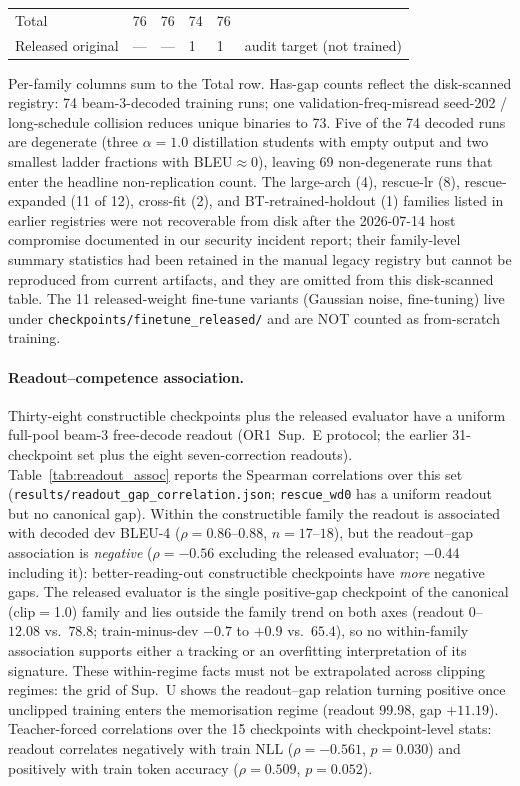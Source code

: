 \documentclass[pdflatex,sn-chicago]{sn-jnl}
\begin{document}
\begin{table}[h]
\begin{tabular}{p{4.2cm}p{1.0cm}p{1.5cm}p{1.4cm}p{1.4cm}p{3.0cm}}
\midrule
Total & 76 & 76 & 74 & 76 & \\
Released original & --- & --- & 1 & 1 & audit target (not trained) \\
\bottomrule
\end{tabular}
\par\smallskip
{\footnotesize Per-family columns sum to the Total row. Has-gap counts reflect the disk-scanned registry: 74 beam-3-decoded training runs; one validation-freq-misread seed-202 / long-schedule collision reduces unique binaries to 73. Five of the 74 decoded runs are degenerate (three $\alpha{=}1.0$ distillation students with empty output and two smallest ladder fractions with BLEU$\approx 0$), leaving 69 non-degenerate runs that enter the headline non-replication count. The large-arch (4), rescue-lr (8), rescue-expanded (11 of 12), cross-fit (2), and BT-retrained-holdout (1) families listed in earlier registries were not recoverable from disk after the 2026-07-14 host compromise documented in our security incident report; their family-level summary statistics had been retained in the manual legacy registry but cannot be reproduced from current artifacts, and they are omitted from this disk-scanned table. The 11 released-weight fine-tune variants (Gaussian noise, fine-tuning) live under \texttt{checkpoints/finetune\_released/} and are NOT counted as from-scratch training.}
\end{table}

\paragraph{Readout--competence association.}
Thirty-eight constructible checkpoints plus the released evaluator have a uniform full-pool beam-3 free-decode readout (OR1~Sup.~E protocol; the earlier 31-checkpoint set plus the eight seven-correction readouts). Table~\ref{tab:readout_assoc} reports the Spearman correlations over this set (\texttt{results/readout\_gap\_correlation.json}; \texttt{rescue\_wd0} has a uniform readout but no canonical gap). Within the constructible family the readout is associated with decoded dev BLEU-4 ($\rho{=}0.86$--$0.88$, $n{=}17$--$18$), but the readout--gap association is \emph{negative} ($\rho{=}{-}0.56$ excluding the released evaluator; $-0.44$ including it): better-reading-out constructible checkpoints have \emph{more} negative gaps. The released evaluator is the single positive-gap checkpoint of the canonical (clip$=$1.0) family and lies outside the family trend on both axes (readout $0$--$12.08$ vs.\ $78.8$; train-minus-dev $-0.7$ to $+0.9$ vs.\ $65.4$), so no within-family association supports either a tracking or an overfitting interpretation of its signature. These within-regime facts must not be extrapolated across clipping regimes: the grid of Sup.~U shows the readout--gap relation turning positive once unclipped training enters the memorisation regime (readout 99.98, gap $+11.19$). Teacher-forced correlations over the 15 checkpoints with checkpoint-level stats: readout correlates negatively with train NLL ($\rho{=}{-}0.561$, $p{=}0.030$) and positively with train token accuracy ($\rho{=}0.509$, $p{=}0.052$).
\end{document}
